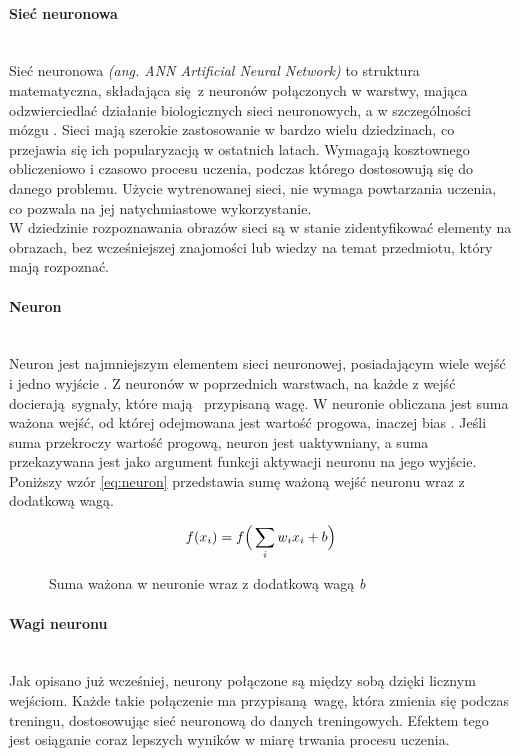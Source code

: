 \paragraph{Sieć neuronowa} \mbox{}\\
Sieć neuronowa \textit{(ang. ANN Artificial Neural Network)} to struktura matematyczna,
składająca się z neuronów połączonych w warstwy, mająca odzwierciedlać działanie
biologicznych sieci neuronowych, a w szczególności mózgu \cite{intuitiveExplanation, WIKIcnn}.
Sieci mają szerokie zastosowanie w bardzo wielu dziedzinach, co przejawia się ich
popularyzacją w ostatnich latach. Wymagają kosztownego obliczeniowo i czasowo
procesu uczenia, podczas którego dostosowują się do danego problemu. Użycie wytrenowanej
sieci, nie wymaga powtarzania uczenia, co pozwala na jej natychmiastowe wykorzystanie.\\
W dziedzinie rozpoznawania obrazów sieci są w stanie zidentyfikować elementy na obrazach,
bez wcześniejszej znajomości lub wiedzy na temat przedmiotu, który mają rozpoznać.

\paragraph{Neuron} \mbox{}\\
Neuron jest najmniejszym elementem sieci neuronowej, posiadającym wiele wejść i jedno wyjście \cite{CS231n_activ, NNbiology, NeuronAnimation}.
Z neuronów w poprzednich warstwach, na każde z wejść docierają sygnały, które mają 
przypisaną wagę. W neuronie obliczana jest suma ważona wejść, od której odejmowana jest
wartość progowa, inaczej bias \cite{needForBias}. Jeśli suma przekroczy wartość progową, neuron jest uaktywniany, a suma
przekazywana jest jako argument funkcji aktywacji neuronu na jego wyjście.\\
Poniższy wzór \ref{eq:neuron} przedstawia sumę ważoną wejść neuronu wraz z dodatkową wagą.
\begin{figure}[h!]
\renewcommand{\figurename}{Wzór}%
\begin{equation} \label{eq:neuron}
f(x_{i}) = f\Big(\sum_{i}w_{i}x_{i} + b \Big)\\
\end{equation}
\caption{Suma ważona w neuronie wraz z dodatkową wagą \textit{b}}
\end{figure}

\paragraph{Wagi neuronu} \mbox{}\\
Jak opisano już wcześniej, neurony połączone są między sobą dzięki licznym wejściom.
Każde takie połączenie ma przypisaną wagę, która zmienia się podczas treningu,
dostosowując sieć neuronową do danych treningowych. Efektem tego jest osiąganie
coraz lepszych wyników w miarę trwania procesu uczenia.

